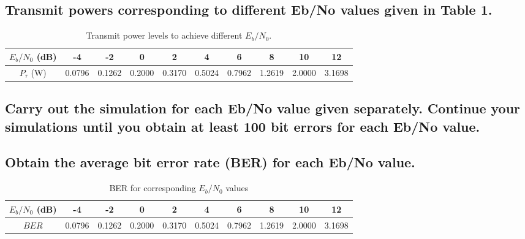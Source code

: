 \documentclass[11pt]{article}
\begin{document}



\subsection{Transmit powers corresponding to different Eb/No values given in Table 1.}

\begin{table}[h]
\centering
\caption{\label{tab:transmit_power_levels}Transmit power levels to achieve different $E_{b}/N_{0}$.}
\begin{tabular}{|c|c|c|c|c|c|c|c|c|c|}

\hline
$E_{b}/N_{0}$ (dB) & -4 & -2 & 0 & 2 & 4 & 6 & 8 & 10 & 12 \\\hline
$P_{\tau}$ (W) & 0.0796 & 0.1262 & 0.2000 & 0.3170 & 0.5024 &	0.7962 &	1.2619	& 2.0000 & 3.1698 \\\hline             %

\end{tabular}

\end{table}

\subsection{Carry out the simulation for each Eb/No value given separately. Continue your simulations until you obtain at least 100 bit errors for each Eb/No value.}
\subsection{Obtain the average bit error rate (BER) for each Eb/No value.}



\begin{table}[h]
\centering
\caption{BER for corresponding $E_{b}/N_{0}$ values}
\begin{tabular}{|c|c|c|c|c|c|c|c|c|c|}

\hline
$E_{b}/N_{0}$ (dB) & -4 & -2 & 0 & 2 & 4 & 6 & 8 & 10 & 12 \\\hline
$BER$  & 0.0796 & 0.1262 & 0.2000 & 0.3170 & 0.5024 &	0.7962 &	1.2619	& 2.0000 & 3.1698 \\\hline             %

\end{tabular}

\end{table}
\end{document}
